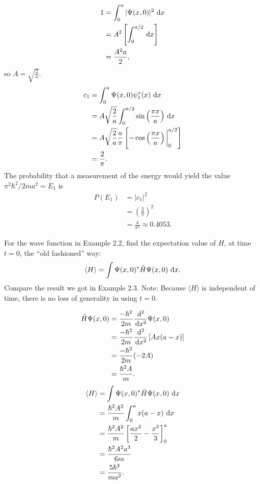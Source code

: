 \documentclass[en, oneside]{vivi}
\begin{document}
\begin{sol}
    \begin{align*}
        1 &= \int_{0}^{a}|\Psi(x, 0)|^2 \dif x\\
        &= A^2 \left[ \int_{0}^{a/2} \dif x \right]\\
        &= \frac{A^2 a}{2},
    \end{align*}
    so $A = \sqrt{\frac{2}{a}}$.
    \begin{align*}
        c_1 &= \int_{0}^{a} \Psi(x, 0) \psi_1^*(x) \dif x\\
        &= A \sqrt{\frac{2}{a}} \int_{0}^{a/2} \sin\left(\frac{\pi x}{a}\right) \dif x\\
        &= A \sqrt{\frac{2}{a}} \frac{a}{\pi} \left[ -\cos\left(\frac{\pi x}{a}\right) \bigg|_{0}^{a/2} \right]\\
        &= \frac{2}{\pi}.
    \end{align*}
    The probability that a measurement of the energy would yield the value $\pi^2 \hbar^2 / 2ma^2 = E_1$ is
    \begin{align*}
        P(E_1) &= |c_1|^2\\
        &= \left(\frac{2}{\pi}\right)^2\\
        &= \frac{4}{\pi^2} \approx 0.4053.
    \end{align*}
\end{sol}

\begin{prob}
    For the wave function in Example 2.2, find the expectation value of $H$, at time $t = 0$, the “old fashioned” way:
    \begin{equation*}
        \langle H \rangle = \int \Psi(x, 0)^* \hat{H} \Psi(x, 0) \dif x.
    \end{equation*}
    Compare the result we got in Example 2.3. Note: Because $\langle H \rangle$ is independent of time, there is no loss of generality in using $t = 0$.
\end{prob}

\begin{sol}
    \begin{align*}
        \hat H \Psi(x, 0) &= \frac{-\hbar^2}{2m} \frac{\dif^2}{\dif x^2} \Psi(x, 0)\\
        &= \frac{-\hbar^2}{2m} \frac{\dif^2}{\dif x^2} \left[ Ax(a - x) \right]\\
        &= \frac{-\hbar^2}{2m} (-2A)\\
        &= \frac{\hbar^2 A}{m}.
    \end{align*}
    \begin{align*}
        \langle H \rangle &= \int \Psi(x, 0)^* \hat{H} \Psi(x, 0) \dif x\\
        &= \frac{\hbar^2 A^2}{m} \int_{0}^{a} x(a - x) \dif x\\
        &= \frac{\hbar^2 A^2}{m} \left[ \frac{ax^2}{2} - \frac{x^3}{3} \right]_0^a\\
        &= \frac{\hbar^2 A^2 a^3}{6m}\\
        &= \frac{5 \hbar^2}{m a^2}.
    \end{align*}
\end{sol}
\end{document}
